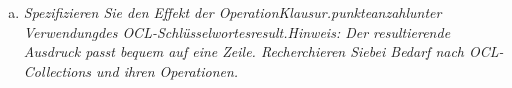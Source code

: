\begin{enumerate}[(a)]
    \item {\itshape Spezifizieren Sie den Effekt der OperationKlausur.punkteanzahlunter Verwendungdes OCL-Schlüsselwortesresult.Hinweis: Der resultierende Ausdruck passt bequem auf eine Zeile. Recherchieren Siebei Bedarf nach OCL-Collections und ihren Operationen.}
    

\end{enumerate}




